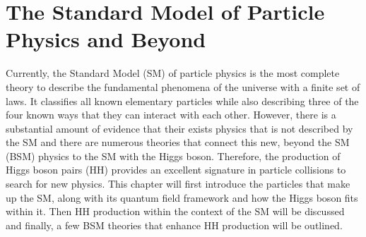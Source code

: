\chapter{The Standard Model of Particle Physics and Beyond}
\label{ch:Theory}

Currently, the Standard Model (SM) of particle physics is the most complete theory to describe the fundamental phenomena of the universe with a finite set of laws. It classifies all known elementary particles while also describing three of the four known ways that they can interact with each other. However, there is a substantial amount of evidence that their exists physics that is not described by the SM and there are numerous theories that connect this new, beyond the SM (BSM) physics to the SM with the Higgs boson. Therefore, the production of Higgs boson pairs (HH) provides an excellent signature in particle collisions to search for new physics. This chapter will first introduce the particles that make up the SM, along with its quantum field framework and how the Higgs boson fits within it. Then HH production within the context of the SM will be discussed and finally, a few BSM theories that enhance HH production will be outlined.




